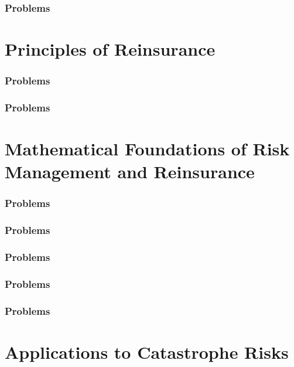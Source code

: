 \documentclass[justified,marginals=raggedright,notoc]{tufte-book}
\begin{document}
\section{Problems}

\part{Principles of Reinsurance}


\section{Problems}


\section{Problems}


\part{Mathematical Foundations of Risk Management and Reinsurance}


\section{Problems}


\section{Problems}


\section{Problems}


\section{Problems}


\section{Problems}


\part{Applications to Catastrophe Risks}

\end{document}
